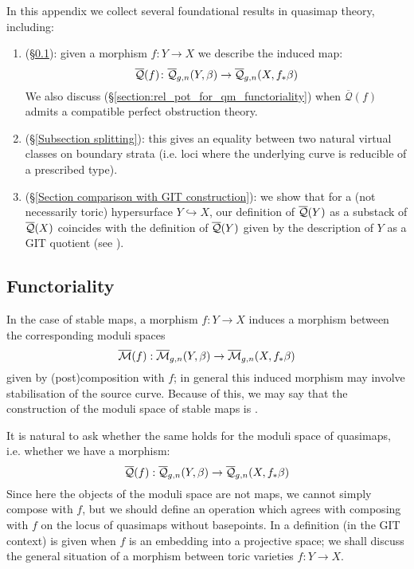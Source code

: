 In this appendix we collect several foundational results in quasimap theory, including:
\begin{enumerate}
\item {} (\S \ref{Functoriality of Quasimap Spaces Section}): given a morphism $f\colon Y\to X$ we describe the induced map:
\begin{equation*} \overline{\mathcal{Q}}(f)\colon\overline{\mathcal Q}_{g,n}(Y,\beta)\rightarrow\overline{\mathcal Q}_{g,n}(X,f_*\beta) \end{equation*}
We also discuss (\S \ref{section:rel_pot_for_qm_functoriality}) when $\overline{\mathcal{Q}}(f)$ admits a compatible perfect obstruction theory.
\item {} (\S \ref{Subsection splitting}): this gives an equality between two natural virtual classes on boundary strata (i.e. loci where the underlying curve is reducible of a prescribed type).
\item {} (\S \ref{Section comparison with GIT construction}): we show that for a (not necessarily toric) hypersurface $Y \hookrightarrow X$, our definition of $\overline{\mathcal{Q}}(Y)$ as a substack of $\overline{\mathcal{Q}}(X)$ coincides with the definition of $\overline{\mathcal{Q}}(Y)$ given by the description of $Y$ as a GIT quotient (see \cite{CFKM}).
\end{enumerate}

\subsection{Functoriality} \label{Functoriality of Quasimap Spaces Section}

In the case of stable maps, a morphism $f : Y \to X$ induces a morphism between the corresponding moduli spaces
\begin{equation*}\overline{\mathcal{M}}(f) : \overline{\mathcal M}_{g,n}(Y,\beta) \rightarrow \overline{\mathcal M}_{g,n}(X,f_* \beta) \end{equation*}
given by (post)composition with $f$; in general this induced morphism may involve stabilisation of the source curve. Because of this, we may say that the construction of the moduli space of stable maps is .

It is natural to ask whether the same holds for the moduli space of quasimaps, i.e. whether we have a morphism:
\begin{equation*} \overline{\mathcal{Q}}(f) : \overline{\mathcal Q}_{g,n}(Y,\beta) \rightarrow \overline{\mathcal Q}_{g,n}(X,f_* \beta) \end{equation*}
Since here the objects of the moduli space are not maps, we cannot simply compose with $f$, but we should define an operation which agrees with composing with $f$ on the locus of quasimaps without basepoints. In \cite[Section 3.1]{CF-K-wallcrossing} a definition (in the GIT context) is given when $f$ is an embedding into a projective space; we shall discuss the general situation of a morphism between toric varieties $f\colon Y\to X$.

